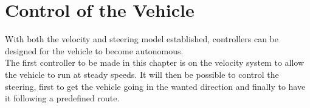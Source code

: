 \chapter{Control of the Vehicle}\label{cha:ControlOfTheVehicle}
With both the velocity and steering model established, controllers can be designed for the vehicle to become autonomous.\\
The first controller to be made in this chapter is on the velocity system to allow the vehicle to run at steady speeds. It will then be possible to control the steering, first to get the vehicle going in the wanted direction and finally to have it following a predefined route.